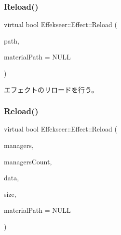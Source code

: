 \subsubsection{\texorpdfstring{Reload()}{Reload()}\hspace{0.1cm}{\footnotesize\ttfamily [2/4]}}
{\footnotesize\ttfamily virtual bool Effekseer\+::\+Effect\+::\+Reload (\begin{DoxyParamCaption}\item[{const \mbox{\hyperlink{_effekseer_8h_a50b026abea014b47854bcd835b3b6233}{E\+F\+K\+\_\+\+C\+H\+AR}} $\ast$}]{path,  }\item[{const \mbox{\hyperlink{_effekseer_8h_a50b026abea014b47854bcd835b3b6233}{E\+F\+K\+\_\+\+C\+H\+AR}} $\ast$}]{material\+Path = {\ttfamily NULL} }\end{DoxyParamCaption})\hspace{0.3cm}{\ttfamily [pure virtual]}}



エフェクトのリロードを行う。 

\mbox{\label{class_effekseer_1_1_effect_a3159f076cc1c4201287c36867d5e1566}} 
\subsubsection{\texorpdfstring{Reload()}{Reload()}\hspace{0.1cm}{\footnotesize\ttfamily [3/4]}}
{\footnotesize\ttfamily virtual bool Effekseer\+::\+Effect\+::\+Reload (\begin{DoxyParamCaption}\item[{\mbox{\hyperlink{class_effekseer_1_1_manager}{Manager}} $\ast$}]{managers,  }\item[{int32\+\_\+t}]{managers\+Count,  }\item[{\mbox{\hyperlink{namespace_effekseer_ab34c4088e512200cf4c2716f168deb56}{void}} $\ast$}]{data,  }\item[{int32\+\_\+t}]{size,  }\item[{const \mbox{\hyperlink{_effekseer_8h_a50b026abea014b47854bcd835b3b6233}{E\+F\+K\+\_\+\+C\+H\+AR}} $\ast$}]{material\+Path = {\ttfamily NULL} }\end{DoxyParamCaption})\hspace{0.3cm}{\ttfamily [pure virtual]}}



